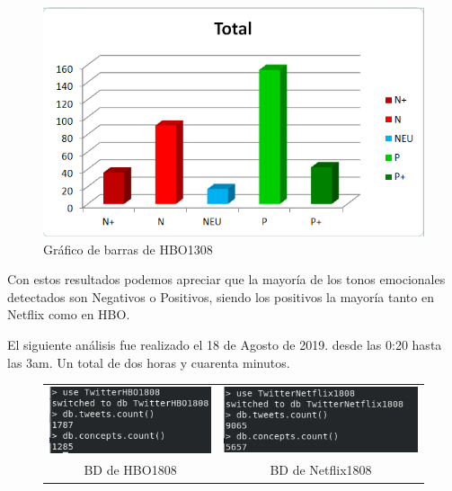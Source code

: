 \begin{figure}[H]
	\centering
	\includegraphics[scale=1]{imagenes/barrasHBO1308.PNG}
	\caption{Gráfico de barras de HBO1308}
	\label{fig:barrasHBO1308}
\end{figure}

Con estos resultados podemos apreciar que la mayoría de los tonos emocionales detectados son Negativos o Positivos, siendo los positivos la mayoría tanto en Netflix como en HBO. 


El siguiente análisis fue realizado el 18 de Agosto de 2019. desde las 0:20 hasta las 3am. Un total de dos horas y cuarenta minutos. 

\begin{figure}[H]
	\centering
	\begin{tabular}{c c}
		
		\includegraphics[scale=.7]{imagenes/HBO1808Mongo.png}
		&  \includegraphics[scale=.7]{imagenes/Netflix1808Mongo.png} \\ 
		
		{BD de HBO1808}
		
		&  {BD de Netflix1808} \\ 
		
	\end{tabular} 
	\label{fig:Mongo1808}
\end{figure}

